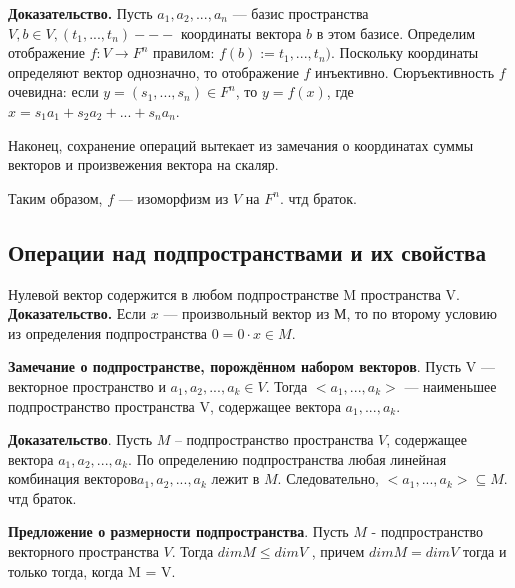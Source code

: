 \documentclass[a4paper]{article}
\begin{document}
    \begin{hproof}
        \textbf{Доказательство.} Пусть $a_1, a_2, ..., a_n$ --- базис пространства $V, b \in V, (t_1, ..., t_n) --- $ координаты вектора $b$ в этом базисе. Определим отображение $f: V \rightarrow F^n$ правилом: $f(b) := t_1, ..., t_n)$. Поскольку координаты определяют вектор однозначно, то отображение $f$ инъективно. Сюръективность $f$ очевидна: если $y = (s_1, ..., s_n) \in F^n$, то $y = f(x)$, где $x = s_1a_1 + s_2a_2 + ... + s_na_n$.

        Наконец, сохранение операций вытекает из замечания о координатах суммы векторов и произвежения вектора на скаляр.

        Таким образом, $f$ --- изоморфизм из $V$ на $F^n$. чтд браток.
    \end{hproof}

    \subsection*{Операции над подпространствами и их свойства}

    Нулевой вектор содержится в любом подпространстве M пространства V.
    \textbf{Доказательство.} Если $x$ --- произвольный вектор из М, то по второму условию из определения подпространства $0 = 0 \cdot x \in M$.

    \begin{htheorem}
        \textbf{Замечание о подпространстве, порождённом набором векторов}. Пусть V --- векторное пространство и $a_1, a_2, ..., a_k \in V$. Тогда $<a_1, ..., a_k>$ --- наименьшее подпространство пространства V, содержащее вектора $a_1, ..., a_k$.
    \end{htheorem}


    \begin{hproof}
        \textbf{Доказательство}. Пусть $M$ – подпространство пространства $V$, содержащее вектора $a_1, a_2, ..., a_k$. По определению подпространства любая линейная комбинация векторов$a_1, a_2, ..., a_k$ лежит в $M$. Следовательно, $<a_1, ..., a_k> \subseteq M$. чтд браток.
    \end{hproof}


    \begin{htheorem}
        \textbf{Предложение о размерности подпространства}.
        Пусть $M$ - подпространство векторного пространства $V$. Тогда
        $dim M \leq dim V$ , причем $dim M = dim V$ тогда и только тогда, когда
        M = V.
    \end{htheorem}
\end{document}
